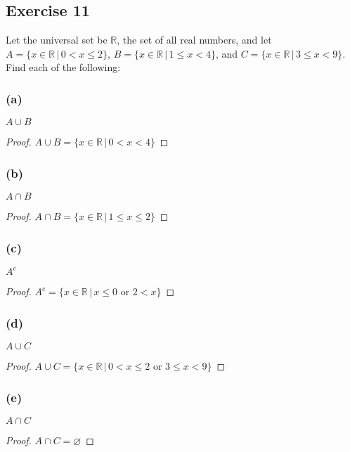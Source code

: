 \documentclass[14pt]{extarticle}
\newcommand{\es}{\varnothing}
\newcommand{\R}{\mathbb{R}}
\begin{document}
\subsection{Exercise 11}
Let the universal set be $\R$, the set of all real numbers, and let \(A = \{x \in \R \,|\, 0 < x \leq 2\}\), \(B = \{x
\in \R \, | \, 1 \leq x < 4\}\), and \(C = \{x \in \R \, | \, 3 \leq x < 9\}\). Find each of the following:

\subsubsection{(a)}
$A \cup B$

\begin{proof}
  \(A \cup B = \{x \in \R \, | \, 0 < x < 4\}\)
\end{proof}

\subsubsection{(b)}
$A \cap B$

\begin{proof}
  \(A \cap B = \{x \in \R \, | \, 1 \leq x \leq 2\}\)
\end{proof}

\subsubsection{(c)}
$A^c$

\begin{proof}
  \(A^c = \{x \in \R \, | \, x \leq 0 \text{ or } 2 < x\}\)
\end{proof}

\subsubsection{(d)}
$A \cup C$

\begin{proof}
  \(A \cup C = \{x \in \R \, | \, 0 < x \leq 2 \text{ or } 3 \leq x < 9\}\)
\end{proof}

\subsubsection{(e)}
$A \cap C$

\begin{proof}
  $A \cap C = \es$
\end{proof}
\end{document}
